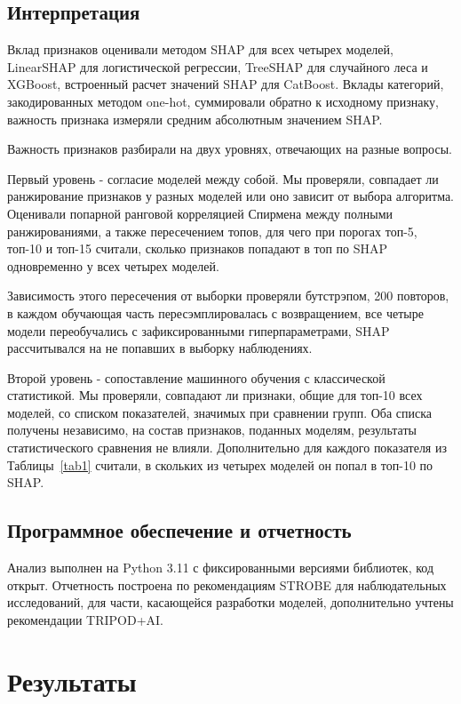 \documentclass[pdflatex,sn-basic,Numbered]{sn-jnl}
\begin{document}
\subsection{Интерпретация}\label{subsec2_10}

Вклад признаков оценивали методом SHAP для всех четырех моделей, LinearSHAP для логистической регрессии, TreeSHAP для случайного леса и XGBoost, встроенный расчет значений SHAP для CatBoost. Вклады категорий, закодированных методом one-hot, суммировали обратно к исходному признаку, важность признака измеряли средним абсолютным значением SHAP.

Важность признаков разбирали на двух уровнях, отвечающих на разные вопросы.

Первый уровень - согласие моделей между собой. Мы проверяли, совпадает ли ранжирование признаков у разных моделей или оно зависит от выбора алгоритма. Оценивали попарной ранговой корреляцией Спирмена между полными ранжированиями, а также пересечением топов, для чего при порогах топ-5, топ-10 и топ-15 считали, сколько признаков попадают в топ по SHAP одновременно у всех четырех моделей.

Зависимость этого пересечения от выборки проверяли бутстрэпом, 200 повторов, в каждом обучающая часть пересэмплировалась с возвращением, все четыре модели переобучались с зафиксированными гиперпараметрами, SHAP рассчитывался на не попавших в выборку наблюдениях.

Второй уровень - сопоставление машинного обучения с классической статистикой. Мы проверяли, совпадают ли признаки, общие для топ-10 всех моделей, со списком показателей, значимых при сравнении групп. Оба списка получены независимо, на состав признаков, поданных моделям, результаты статистического сравнения не влияли. Дополнительно для каждого показателя из Таблицы~\ref{tab1} считали, в скольких из четырех моделей он попал в топ-10 по SHAP.

\subsection{Программное обеспечение и отчетность}\label{subsec2_11}

Анализ выполнен на Python 3.11 с фиксированными версиями библиотек, код открыт. Отчетность построена по рекомендациям STROBE для наблюдательных исследований, для части, касающейся разработки моделей, дополнительно учтены рекомендации TRIPOD+AI.

\section{Результаты}\label{sec3}
\end{document}
